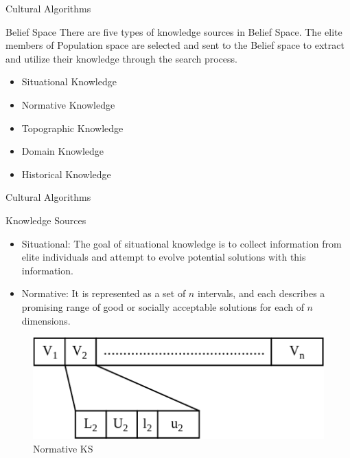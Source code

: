 \documentclass[table]{beamer}
\begin{document}
	\begin{frame}{Cultural Algorithms}
		\justifying
		\begin{block}{Belief Space}
			There are five types of \alert{knowledge sources} in Belief Space. The elite members of Population space are selected and sent to the Belief space to extract and utilize their knowledge through the search process. \cite{reynolds2010weaving}
		\end{block}
		\begin{block}{}
			\begin{itemize}
				\item Situational Knowledge
				\item Normative Knowledge
				\item Topographic Knowledge
				\item Domain Knowledge
				\item Historical Knowledge
			\end{itemize}
		\end{block}
	\end{frame}
	
	\begin{frame}{Cultural Algorithms}
		\begin{block}{Knowledge Sources}
			\begin{itemize}
				\item Situational: The goal of situational knowledge is to collect information from elite individuals and attempt to evolve potential solutions with this information.
				\item Normative: It is represented as a set of $n$ intervals, and each describes a promising range of good or socially acceptable solutions for each of $n$ dimensions.
			\end{itemize}
		\end{block}
		\begin{figure}[v]
			\includegraphics[scale=0.4]{normative}
			\centering
			\caption{Normative KS}
			\label{ref:normative}
		\end{figure}
	\end{frame}
	
\end{document}
